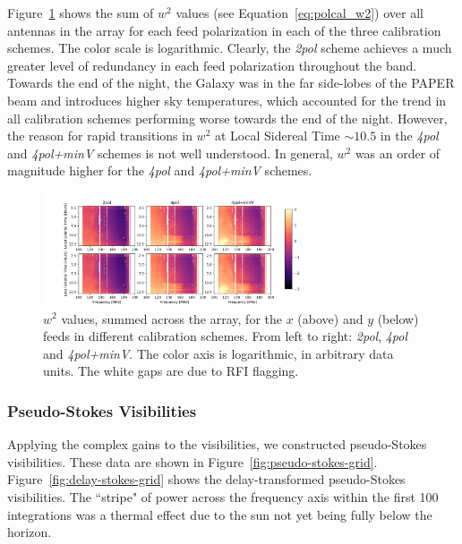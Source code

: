 Figure~\ref{fig:polcal_chisq} shows the sum of $w^2$ values (see Equation~\ref{eq:polcal_w2}) over all antennas in the array for each feed polarization in each of the three calibration schemes. The color scale is logarithmic. Clearly, the \textit{2pol} scheme achieves a much greater level of redundancy in each feed polarization throughout the band. Towards the end of the night, the Galaxy was in the far side-lobes of the PAPER beam and introduces higher sky temperatures, which accounted for the trend in all calibration schemes performing worse towards the end of the night. However, the reason for rapid transitions in $w^2$ at Local Sidereal Time $\sim 10.5$ in the \textit{4pol} and \textit{4pol+minV} schemes is not well understood. In general, $w^2$ was an order of magnitude higher for the \textit{4pol} and \textit{4pol+minV} schemes.

\begin{figure}
\centering
\includegraphics[width=0.75\textwidth]{chapters/polcal/figures/chisq.png}
\caption[$w^2$ values, summed across the array.]{$w^2$ values, summed across the array, for the $x$ (above) and $y$ (below) feeds in different calibration schemes. From left to right: \textit{2pol}, \textit{4pol} and \textit{4pol+minV}. The color axis is logarithmic, in arbitrary data units. The white gaps are due to RFI flagging.}
\label{fig:polcal_chisq}
\end{figure}

\subsubsection{Pseudo-Stokes Visibilities}

Applying the complex gains to the visibilities, we constructed pseudo-Stokes visibilities. These data are shown in Figure~\ref{fig:pseudo-stokes-grid}. Figure~\ref{fig:delay-stokes-grid} shows the delay-transformed pseudo-Stokes visibilities. The ``stripe" of power across the frequency axis within the first 100 integrations was a thermal effect due to the sun not yet being fully below the horizon.

